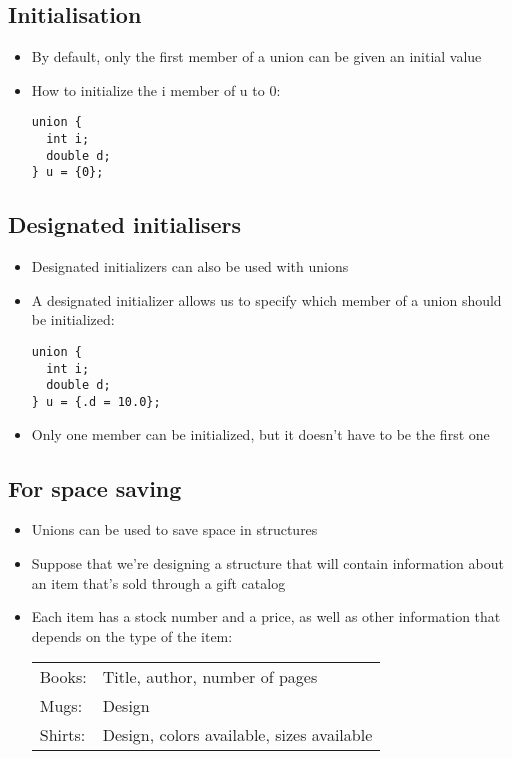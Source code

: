 \documentclass{article}
\begin{document}
\subsection{Initialisation}
\begin{itemize}
\item By default, only the first member of a union can be given an initial value
\item How to initialize the i member of u to 0:
\begin{verbatim}
union {
  int i;
  double d;
} u = {0};
\end{verbatim}
\end{itemize}



\subsection{Designated initialisers}
\begin{itemize}
\item Designated initializers can also be used with unions
\item A designated initializer allows us to specify which member of a union should be initialized:
\begin{verbatim}
union {
  int i;
  double d;
} u = {.d = 10.0};
\end{verbatim}
\item Only one member can be initialized, but it doesn't have to be the first one
\end{itemize}



\subsection{For space saving}
\begin{itemize}
\item Unions can be used to save space in structures
\item Suppose that we're designing a structure that will contain information about an item that's sold through a gift catalog
\item Each item has a stock number and a price, as well as other information that depends on the type of the item:
\begin{tabular}{ll}
Books: & Title, author, number of pages\\
Mugs: & Design\\
Shirts: & Design, colors available, sizes available\\
\end{tabular}
\end{itemize}
\end{document}
